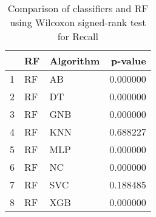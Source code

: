 \begin{table}
\footnotesize
\caption{Comparison of classifiers and RF using Wilcoxon signed-rank test for Recall}
\label{tab:RF wilcoxon Recall comparison}
\begin{tabular}{lllr}
\hline
 & RF & Algorithm & p-value \\
\hline
1 & RF & AB & 0.000000 \\
2 & RF & DT & 0.000000 \\
3 & RF & GNB & 0.000000 \\
4 & RF & KNN & 0.688227 \\
5 & RF & MLP & 0.000000 \\
6 & RF & NC & 0.000000 \\
7 & RF & SVC & 0.188485 \\
8 & RF & XGB & 0.000000 \\
\hline
\end{tabular}
\end{table}
